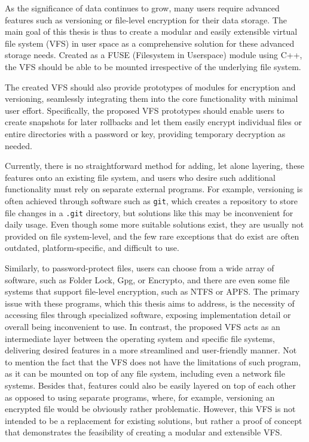 
As the significance of data continues to grow, many users require advanced features such as versioning or file-level encryption for their data storage.
The main goal of this thesis is thus to create a modular and easily extensible virtual file system (VFS) in user space as a comprehensive solution for these advanced storage needs.
Created as a FUSE (Filesystem in Userspace) module using C++, the VFS should be able to be mounted irrespective of the underlying file system.

The created VFS should also provide prototypes of modules for encryption and versioning, seamlessly integrating them into the core functionality with minimal user effort.
Specifically, the proposed VFS prototypes should enable users to create snapshots for later rollbacks and let them easily encrypt individual files or entire directories with a password or key, providing temporary decryption as needed.

Currently, there is no straightforward method for adding, let alone layering, these features onto an existing file system, and users who desire such additional functionality must rely on separate external programs.
For example, versioning is often achieved through software such as \texttt{git}, which creates a repository to store file changes in a \texttt{.git} directory, but solutions like this may be inconvenient for daily usage.
Even though some more suitable solutions exist, they are usually not provided on file system-level, and the few rare exceptions that do exist are often outdated, platform-specific, and difficult to use.

Similarly, to password-protect files, users can choose from a wide array of software, such as Folder Lock, Gpg, or Encrypto, and there are even some file systems that support file-level encryption, such as NTFS or APFS\@.
The primary issue with these programs, which this thesis aims to address, is the necessity of accessing files through specialized software, exposing implementation detail or overall being inconvenient to use.
In contrast, the proposed VFS acts as an intermediate layer between the operating system and specific file systems, delivering desired features in a more streamlined and user-friendly manner.
Not to mention the fact that the VFS does not have the limitations of such program, as it can be mounted on top of any file system, including even a network file systems.
Besides that, features could also be easily layered on top of each other as opposed to using separate programs, where, for example, versioning an encrypted file would be obviously rather problematic.
However, this VFS is not intended to be a replacement for existing solutions, but rather a proof of concept that demonstrates the feasibility of creating a modular and extensible VFS\@.

